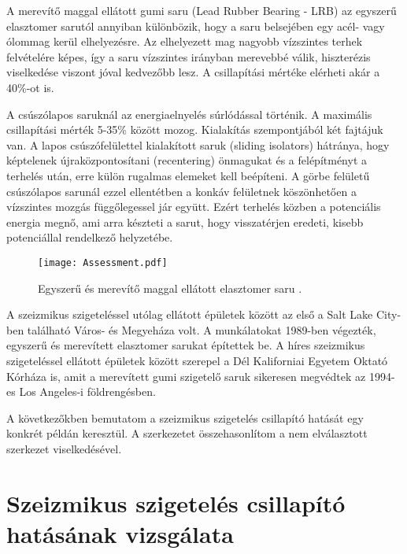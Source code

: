 A merevítő maggal ellátott gumi saru (Lead Rubber  Bearing -  LRB) az egyszerű elasztomer sarutól annyiban különbözik, hogy a saru belsejében egy acél- vagy ólommag kerül elhelyezésre. Az elhelyezett mag nagyobb vízszintes terhek felvételére képes, így a saru vízszintes irányban merevebbé válik, hiszterézis viselkedése viszont jóval kedvezőbb lesz. A csillapítási mértéke elérheti akár a  40\%-ot is.
 
A csúszólapos saruknál az energiaelnyelés súrlódással történik. A  maximális csillapítási mérték 5-35\% között mozog. Kialakítás szempontjából két fajtájuk van. A  lapos csúszófelülettel kialakított saruk (sliding isolators) hátránya, hogy képtelenek újraközpontosítani (recentering) önmagukat és a felépítményt a terhelés után, erre külön rugalmas elemeket kell beépíteni. A görbe felületű csúszólapos sarunál ezzel ellentétben a konkáv felületnek köszönhetően a vízszintes mozgás  függőlegessel jár együtt. Ezért terhelés közben  a potenciális energia megnő, ami arra készteti a sarut, hogy visszatérjen eredeti, kisebb potenciállal rendelkező helyzetébe. 
  
 
\begin{figure}[h!]
\centering
\texttt{[image: Assessment.pdf]}
\caption{Egyszerű és merevítő maggal ellátott elasztomer saru \cite{rubber}.}
\label{fig:linprog}
\end{figure}
 
A szeizmikus szigeteléssel utólag ellátott épületek között az első a Salt Lake City-ben található Város- és Megyeháza volt. A munkálatokat 1989-ben végezték, egyszerű és merevített elasztomer sarukat építettek be. A híres szeizmikus szigeteléssel ellátott épületek között  szerepel a Dél Kaliforniai Egyetem Oktató Kórháza is, amit a merevített gumi szigetelő saruk sikeresen megvédtek az  1994-es Los Angeles-i földrengésben.
 
A következőkben bemutatom a szeizmikus szigetelés csillapító hatását egy konkrét példán keresztül. A szerkezetet összehasonlítom a nem elválasztott szerkezet viselkedésével.

\section{Szeizmikus szigetelés  csillapító hatásának vizsgálata}

{\ }

